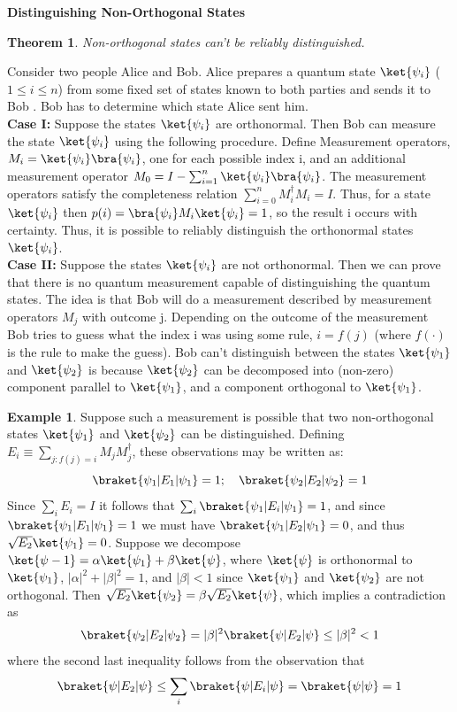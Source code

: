 \documentclass[12pt, oneside]{book}
\newtheorem{theorem}{Theorem}[section]
\theoremstyle{definition}
\theoremstyle{definition}
\newtheorem{example}{Example}[section]
\theoremstyle{remark}
\begin{document}
\begin{importantnote}
    \textbf{Distinguishing Non-Orthogonal States}
    \begin{theorem}
        Non-orthogonal states can't be reliably distinguished.
    \end{theorem}
    Consider two people Alice and Bob. Alice prepares a quantum state $\ket{\psi_i}$ ($1\leq i\leq n$) from some fixed set of states known to both parties and sends it to Bob . Bob has to determine which state Alice sent him.\\
\textbf{Case I: }
    Suppose the states $\ket{\psi_i}$ are orthonormal. Then Bob can measure the state $\ket{\psi_i}$ using the following procedure. Define Measurement operators, $M_i=\ket{\psi_i}\bra{\psi_i}$, one for each possible index i, and an additional 
    measurement operator $M_0=I-\sum_{i=1}^{n}\ket{\psi_i}\bra{\psi_i}$. The measurement operators satisfy the completeness relation $\sum_{i=0}^{n}M_i^{\dagger}M_i=I$. Thus, for a state $\ket{\psi_i}$ then $p(i)=\bra{\psi_i}M_i\ket{\psi_i}=1$, so the result i occurs
    with certainty. Thus, it is possible to reliably distinguish the orthonormal states $\ket{\psi_i}$.\\
\textbf{Case II:}
    Suppose the states $\ket{\psi_i}$ are not orthonormal. Then we can prove that there is no quantum measurement 
    capable of distinguishing the quantum states. The idea is that Bob will do a measurement described by measurement operators $M_j$ with 
    outcome j. Depending on the outcome of the measurement Bob tries to guess what the index i was using some rule,
    $i=f(j)$ (where $f(\cdot)$ is the rule to make the guess). Bob can't distinguish between the states $\ket{\psi_1}$ and $\ket{\psi_2}$ 
    is because $\ket{\psi_2}$ can be decomposed into (non-zero) component parallel to $\ket{\psi_1}$, and a component orthogonal to $\ket{\psi_1}$.
    \begin{example}
        Suppose such a measurement is possible that two non-orthogonal states $\ket{\psi_1}$ and $\ket{\psi_2}$ can be distinguished. Defining $E_i\equiv \sum_{j:f(j)=i} M_jM_j^{\dagger}$, these observations may be written as:
        \[
        \braket{\psi_1|E_1|\psi_1}=1; \quad \braket{\psi_2|E_2|\psi_2}=1
        \]
        Since $\sum_iE_i=I$ it follows that $\sum_i \braket{\psi_1|E_i|\psi_1}=1$, and since $\braket{\psi_1|E_1|\psi_1}=1$ we must have $\braket{\psi_1|E_2|\psi_1}=0$, and thus $\sqrt{E_2}\ket{\psi_1}=0$. Suppose we decompose $\ket{\psi-1}=\alpha\ket{\psi_1}+\beta\ket{\psi}$, where $\ket{\psi}$ is orthonormal to $\ket{\psi_1}$, $|\alpha|^2+|\beta|^2=1$, and $|\beta|<1$ since $\ket{\psi_1}$ and $\ket{\psi_2}$ are not orthogonal. Then $\sqrt{E_2}\ket{\psi_2}=\beta\sqrt{E_2}\ket{\psi}$, which implies a contradiction as
        \[
        \braket{\psi_2|E_2|\psi_2}=|\beta|^2\braket{\psi|E_2|\psi}\leq |\beta|^2 < 1
        \]
        where the second last inequality follows from the observation that
        \[
        \braket{\psi|E_2|\psi} \leq \sum_i \braket{\psi|E_i|\psi}=\braket{\psi|\psi} = 1
        \]
    \end{example}
\end{importantnote}
\end{document}
